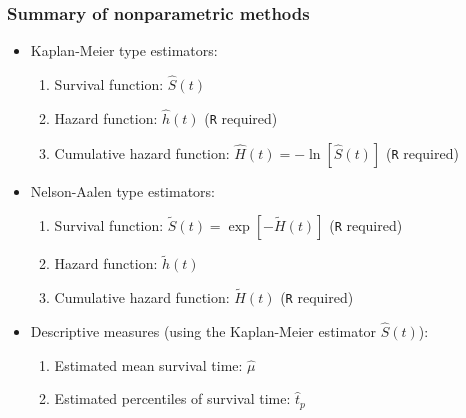 \begin{frame}
\frametitle{Summary of nonparametric methods}
\begin{itemize}
\item Kaplan-Meier type estimators:
  \begin{enumerate}
  \item Survival function: $\widehat{S}(t)$
  \item Hazard function: $\hat{h}(t)$ (\texttt{R} required)
  \item Cumulative hazard function: $\hat{H}(t)=-\ln[\widehat{S}(t)]$ (\texttt{R} required)
  \end{enumerate}

\item Nelson-Aalen type estimators:
  \begin{enumerate}
  \item Survival function: $\tilde{S}(t)=\exp[-\tilde{H}(t)]$ (\texttt{R} required)
  \item Hazard function: $\tilde{h}(t)$
  \item Cumulative hazard function: $\tilde{H}(t)$ (\texttt{R} required)
  \end{enumerate}

\item Descriptive measures (using the Kaplan-Meier estimator $\widehat{S}(t)$):
 \begin{enumerate}
 \item Estimated mean survival time: $\hat{\mu}$
 \item Estimated percentiles of survival time: $\hat{t}_p$
 \end{enumerate}
\end{itemize}
\end{frame}



